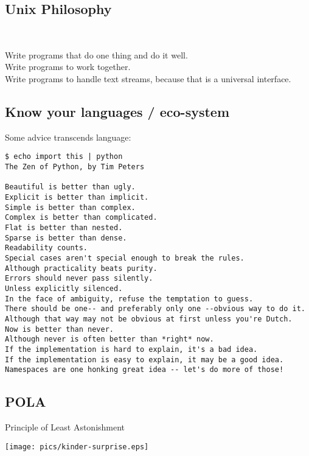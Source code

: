 \documentclass[xga]{xdvislides}
\begin{document}
\subsection{Unix Philosophy}
\\
\Huge
\begin{center}
	Write programs that do one thing and do it well.\\
	\vspace{.5in}
	Write programs to work together. \\
	\vspace{.5in}
	Write programs to handle text streams, because that is a universal interface.
\end{center}
\Normalsize

\subsection{Know your languages / eco-system}
Some advice transcends language: \\

\small
\begin{verbatim}
$ echo import this | python
The Zen of Python, by Tim Peters

Beautiful is better than ugly.
Explicit is better than implicit.
Simple is better than complex.
Complex is better than complicated.
Flat is better than nested.
Sparse is better than dense.
Readability counts.
Special cases aren't special enough to break the rules.
Although practicality beats purity.
Errors should never pass silently.
Unless explicitly silenced.
In the face of ambiguity, refuse the temptation to guess.
There should be one-- and preferably only one --obvious way to do it.
Although that way may not be obvious at first unless you're Dutch.
Now is better than never.
Although never is often better than *right* now.
If the implementation is hard to explain, it's a bad idea.
If the implementation is easy to explain, it may be a good idea.
Namespaces are one honking great idea -- let's do more of those!
\end{verbatim}
\Normalsize


\subsection{POLA}
Principle of Least Astonishment
\\
\vspace*{\fill}
\begin{center}
	\texttt{[image: pics/kinder-surprise.eps]}
\end{center}
\vspace*{\fill}
\end{document}
